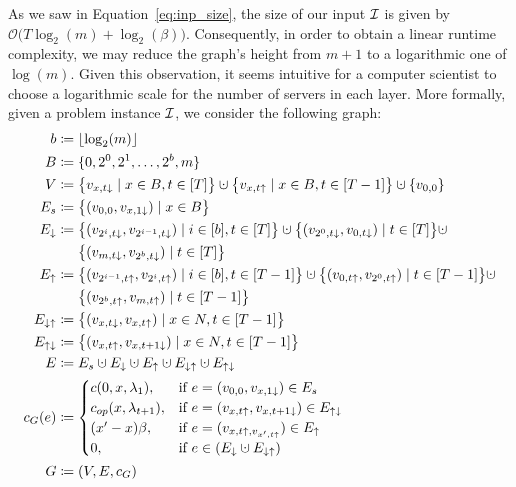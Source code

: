 As we saw in Equation~\eqref{eq:inp_size}, the size of our input $\mathcal{I}$ is given by $\mathcal{O}\bigl(T\log_2(m)+\log_2(\beta)\bigr)$. Consequently, in order to obtain a linear runtime complexity, we may reduce the graph's height from $m+1$ to a logarithmic one of $\log(m)$. Given this observation, it seems intuitive for a computer scientist to choose a logarithmic scale for the number of servers in each layer. More formally, given a problem instance $\mathcal{I}$, we consider the following graph:
\begin{align*}
	b&\coloneqq\lfloor\log_2(m)\rfloor\\
	B&\coloneqq\{0,2^0,2^1,\ldots,2^b,m\}\\
	V&\coloneqq\bigl\{v_{x,t\downarrow}\mid x\in B,t\in[T]\bigr\}\dotcup\bigl\{v_{x,t\uparrow}\mid x\in B, t\in[T-1]\bigr\}\dotcup\{v_{0,0}\}\\
	E_s&\coloneqq\bigl\{(v_{0,0},v_{x,1\downarrow})\mid x\in B\bigr\}\\
	E_\downarrow&\coloneqq\bigl\{(v_{2^i,t\downarrow},v_{2^{i-1},t\downarrow})\mid i\in[b],t\in[T]\bigr\}\dotcup\bigl\{(v_{2^0,t\downarrow},v_{0,t\downarrow})\mid t\in[T]\bigr\}\dotcup\\
	&\phantom{{}\coloneqq{}}\bigl\{(v_{m,t\downarrow},v_{2^b,t\downarrow})\mid t\in[T]\bigr\}\\
	E_\uparrow&\coloneqq\bigl\{(v_{2^{i-1},t\uparrow},v_{2^i,t\uparrow})\mid i\in[b],t\in[T-1]\bigr\}\dotcup\bigl\{(v_{0,t\uparrow},v_{2^0,t\uparrow})\mid t\in[T-1]\bigr\}\dotcup\\
	&\phantom{{}\coloneqq{}}\bigl\{(v_{2^b,t\uparrow},v_{m,t\uparrow})\mid t\in[T-1]\bigr\}\\
E_{\downarrow\uparrow}&\coloneqq\bigl\{(v_{x,t\downarrow},v_{x,t\uparrow})\mid x\in N,t\in[T-1]\bigr\}\\
	E_{\uparrow\downarrow}&\coloneqq\bigl\{(v_{x,t\uparrow},v_{x,t+1\downarrow})\mid x\in N,t\in[T-1]\bigr\}\\
	E&\coloneqq E_s\dotcup E_\downarrow\dotcup E_\uparrow\dotcup E_{\downarrow\uparrow}\dotcup E_{\uparrow\downarrow}\\
	c_G(e)&\coloneqq
	\begin{cases}
		\costs(0,x,\lambda_1), & \text{if $e=(v_{0,0},v_{x,1\downarrow})\in E_s$}\\
		\opcosts(x,\lambda_{t+1}), & \text{if $e=(v_{x,t\uparrow},v_{x,t+1\downarrow})\in E_{\uparrow\downarrow}$}\\
		(x'-x)\beta, & \text{if $e=(v_{x,t\uparrow,v_{x',t\uparrow}})\in E_\uparrow$}\\
		0, & \text{if $e\in(E_\downarrow\dotcup E_{\downarrow\uparrow})$}
	\end{cases}\\
	G&\coloneqq(V,E,c_G)
\end{align*}
